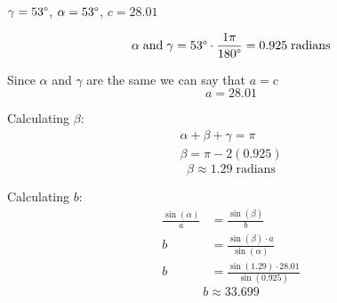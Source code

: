 \begin{problem}[12.]
    $\gamma = 53\degree$, $\alpha = 53\degree$, $c = 28.01$
\end{problem}

\begin{solution}
    \[\alpha \; \text{and} \; \gamma = 53\degree \cdot \frac{1\pi}{180\degree} = 0.925 \; \text{radians}\]
    
    Since $\alpha$ and $\gamma$ are the same we can say that $a = c$
    \[\boxed{a = 28.01}\]
    
    Calculating $\beta$:
    \begin{align}
        \alpha + \beta + \gamma = \pi \\
        \beta = \pi - 2(0.925)
    \end{align}
    \[\boxed{ \beta \approx 1.29 \; \text{radians}  }\]
    
    Calculating $b$:
    \begin{align}
        \frac{\sin(\alpha)}{a} &= \frac{\sin(\beta)}{b} \\
        b &= \frac{\sin(\beta) \cdot a}{\sin(\alpha)} \\
        b &= \frac{\sin(1.29) \cdot 28.01}{\sin(0.925)}
    \end{align}
    \[\boxed{ b \approx 33.699  }\]
\end{solution}